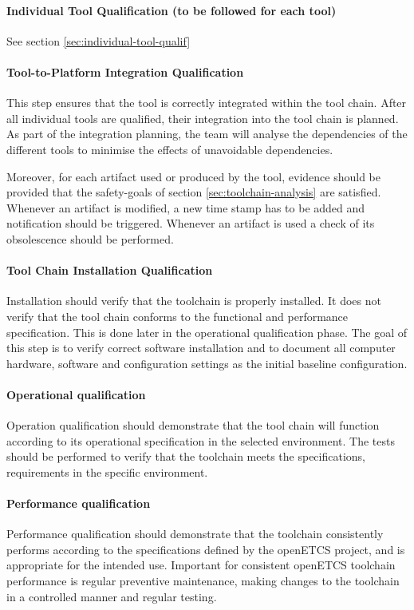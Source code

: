 \paragraph{Individual Tool Qualification (to be followed for each tool)}
See section \ref{sec:individual-tool-qualif}

\paragraph{Tool-to-Platform Integration Qualification}
This step ensures that the tool is correctly integrated within the tool chain.
After all individual tools are qualified, their integration into the
tool chain is planned. As part of the integration planning, the team
will analyse the dependencies of the different tools to minimise the
effects of unavoidable dependencies.

Moreover, for each artifact used or produced by the tool, evidence
should be provided that the safety-goals of section
\ref{sec:toolchain-analysis} are satisfied. 
Whenever an artifact is modified, a new time stamp has to be added and
notification should be triggered. Whenever an artifact is used a check
of its obsolescence should be performed.

\paragraph{Tool Chain Installation Qualification}
Installation should verify that the toolchain is properly
installed. It does not verify that the tool chain conforms to the functional and performance specification. This is done later in the operational qualification phase. The goal of this step is to verify correct software installation and to document all computer hardware, software and configuration settings as the initial baseline configuration.

\paragraph{Operational qualification}
Operation qualification should demonstrate that the tool chain will function according to its operational specification in the selected environment. The tests should be performed to verify that the toolchain meets the specifications, requirements in the specific environment.

\paragraph{Performance qualification}
Performance qualification should demonstrate that the toolchain consistently performs according to the specifications defined by the openETCS project, and is appropriate for the intended use. Important for consistent openETCS toolchain performance is regular preventive maintenance, making changes to the toolchain in a controlled manner and regular testing.

